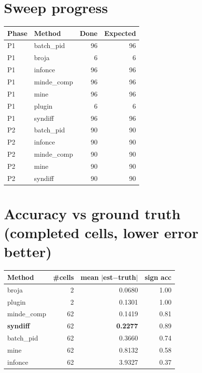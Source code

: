 \documentclass[11pt]{article}
\begin{document}
\section*{Sweep progress}
\begin{tabular}{llrr}\toprule Phase & Method & Done & Expected\\\midrule
P1 & batch\_pid & \color{green!50!black}96 & 96\\
P1 & broja & \color{green!50!black}6 & 6\\
P1 & infonce & \color{green!50!black}96 & 96\\
P1 & minde\_comp & \color{green!50!black}96 & 96\\
P1 & mine & \color{green!50!black}96 & 96\\
P1 & plugin & \color{green!50!black}6 & 6\\
P1 & syndiff & \color{green!50!black}96 & 96\\
P2 & batch\_pid & \color{green!50!black}90 & 90\\
P2 & infonce & \color{green!50!black}90 & 90\\
P2 & minde\_comp & \color{green!50!black}90 & 90\\
P2 & mine & \color{green!50!black}90 & 90\\
P2 & syndiff & \color{green!50!black}90 & 90\\
\bottomrule\end{tabular}
\section*{Accuracy vs ground truth (completed cells, lower error better)}
\begin{tabular}{lrrr}\toprule Method & \#cells & mean $|$est$-$truth$|$ & sign acc\\\midrule
broja & 2 & 0.0680 & 1.00\\
plugin & 2 & 0.1301 & 1.00\\
minde\_comp & 62 & 0.1419 & 0.81\\
\textbf{syndiff} & 62 & \textbf{0.2277} & 0.89\\
batch\_pid & 62 & 0.3660 & 0.74\\
mine & 62 & 0.8132 & 0.58\\
infonce & 62 & 3.9327 & 0.37\\
\bottomrule\end{tabular}
\end{document}
